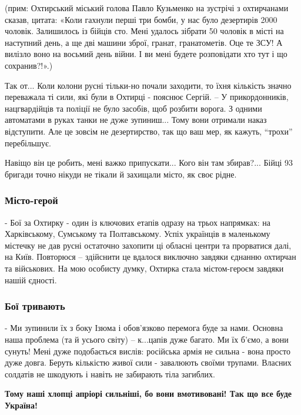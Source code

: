 (прим: Охтирський міський голова Павло Кузьменко на зустрічі з охтирчанами
сказав, цитата: «Коли гахнули перші три бомби, у нас було дезертирів 2000
чоловік. Залишилось із бійців сто. Мені удалось зібрати 50 чоловік в місті на
наступний день, а ще дві машини зброї, гранат, гранатометів. Оце те ЗСУ! А
вилізло воно на восьмий день війни. І ви мені будете розповідати хто тут і що
сохранив?!».)

Так от... Коли колони русні тільки-но почали заходити, то їхня кількість значно
переважала ті сили, які були в Охтирці - пояснює Сергій. – У прикордонників,
нацгвардійців та поліції не було засобів, щоб розбити ворога. З одними
автоматами в руках танки не дуже зупиниш... Тому вони отримали наказ
відступити. Але це зовсім не дезертирство, так що ваш мер, як кажуть,
\enquote{трохи} перебільшує.

Навіщо він це робить, мені важко припускати... Кого він там збирав?... Бійці 93
бригади точно нікуди не тікали й захищали місто, як своє рідне. 

\subsubsection{Місто-герой}

- Бої за Охтирку - один із ключових етапів одразу на трьох напрямках: на
Харківському, Сумському та Полтавському. Успіх українців в маленькому містечку
не дав русні остаточно захопити ці обласні центри та прорватися далі, на Київ.
Повторюся – здійснити це вдалося виключно завдяки єднанню охтирчан та
військових. На мою особисту думку, Охтирка стала містом-героєм завдяки нашій
єдності.

\subsubsection{Бої тривають}

- Ми зупинили їх з боку Ізюма і обов'язково перемога буде за нами. Основна наша
проблема (та й усього світу) – к...цапів дуже багато. Ми їх б'ємо, а вони
сунуть! Мені дуже подобається вислів: російська армія не сильна - вона просто
дуже довга. Беруть кількістю живої сили - завалюють своїми трупами. Власних
солдатів не шкодують і навіть не забирають тіла загиблих.

\textbf{Тому наші хлопці апріорі сильніші, бо вони вмотивовані! Так що все буде
Україна!}
